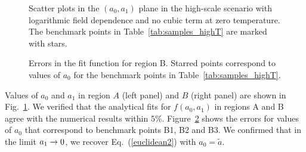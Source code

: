 \documentclass[a4paper,11pt]{article}
\begin{document}
\begin{figure}[t]
\begin{center}
\caption{Scatter plots in the $(a_0, a_1)$ plane in the high-scale scenario with logarithmic  field dependence
and no cubic term at zero temperature. The benchmark points in Table~\ref{tab:samples_highT} are marked with stars.}
\label{figa0a1}
\end{center}
\end{figure}
\begin{figure}[t!]
\begin{center}
\caption{Errors in the fit function for region B. Starred points correspond to values of $a_0$ 
for the benchmark points in Table~\ref{tab:samples_highT}.}
\label{fig:errors}
\end{center}
\end{figure}
Values of $a_0$ and $a_1$ in region $A$ (left panel) and $B$ (right panel) are shown in Fig.~\ref{figa0a1}. 
We verified that the analytical fits for $f(a_0,a_1)$ in regions A and B agree with  the numerical results within $5\%$. 
Figure~\ref{fig:errors} shows the errors for values of $a_0$ that correspond to benchmark points B1, B2 and B3.
We confirmed that in the limit $a_1 \rightarrow 0$, we recover Eq.~(\ref{euclidean2}) with $a_0 = \widetilde{a}$. 
\end{document}
